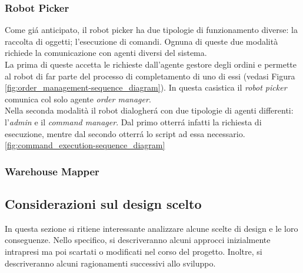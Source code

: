 \subsubsection{Robot Picker}
Come gi\'a anticipato, il robot picker ha due tipologie di funzionamento diverse: la raccolta di oggetti; l'esecuzione di comandi. Ognuna di queste due modalità richiede la comunicazione con agenti diversi del sistema.\\
La prima di queste accetta le richieste dall'agente gestore degli ordini e permette al robot di far parte del processo di completamento di uno di essi (vedasi Figura \ref{fig:order_management-sequence_diagram}). In questa casistica il \textit{robot picker} comunica col solo agente \textit{order manager}.\\
Nella seconda modalità il robot dialogher\'a con due tipologie di agenti differenti: l'\textit{admin} e il \textit{command manager}. Dal primo otterr\'a infatti la richiesta di esecuzione, mentre dal secondo otterr\'a lo script ad essa necessario.
\ref{fig:command_execution-sequence_diagram}

\subsubsection{Warehouse Mapper}

\subsection{Considerazioni sul design scelto}
In questa sezione si ritiene interessante analizzare alcune scelte di design e le loro conseguenze. Nello specifico, si descriveranno alcuni approcci inizialmente intrapresi ma poi scartati o modificati nel corso del progetto. Inoltre, si descriveranno alcuni ragionamenti successivi allo sviluppo.

